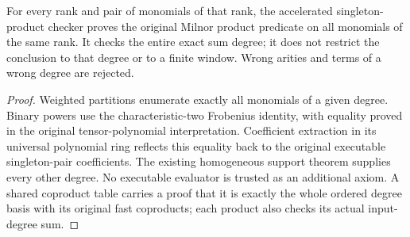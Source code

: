 \begin{lemma}
  \label{lem:lin-secondary-fast-milnor-checker}
  \leanok
  For every rank and pair of monomials of that rank, the accelerated
  singleton-product checker proves the original Milnor product predicate
  on all monomials of the same rank. It checks the entire exact sum degree;
  it does not restrict the conclusion to that degree or to a finite window.
  Wrong arities and terms of a wrong degree are rejected.
\end{lemma}
\begin{proof}
  \leanok
  Weighted partitions enumerate exactly all monomials of a given degree.
  Binary powers use the characteristic-two Frobenius identity, with equality
  proved in the original tensor-polynomial interpretation. Coefficient
  extraction in its universal polynomial ring reflects this equality back
  to the original executable singleton-pair coefficients. The existing
  homogeneous support theorem supplies every other degree. No executable
  evaluator is trusted as an additional axiom. A shared coproduct table carries
  a proof that it is exactly the whole ordered degree basis with its original
  fast coproducts; each product also checks its actual input-degree sum.
\end{proof}

